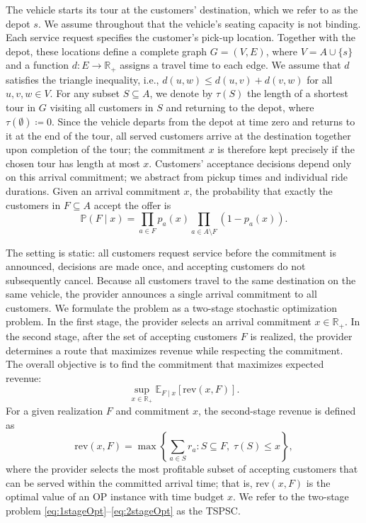 \documentclass[11pt]{article}
\theoremstyle{plain}
\theoremstyle{definition}
\begin{document}
	The vehicle starts its tour at the customers' destination, which we refer to as the depot $s$. We assume throughout that the vehicle's seating capacity is not binding. Each service request specifies the customer's pick-up location. Together with the depot, these locations define a complete graph $G = (V, E)$, where $V = A \cup \{s\}$ and a function $d \colon E \to \mathbb{R}_+$ assigns a travel time to each edge. We assume that $d$ satisfies the triangle inequality, i.e., $d(u,w) \leq d(u,v) + d(v,w)$ for all $u,v,w \in V$. For any subset $S \subseteq A$, we denote by $\tau(S)$ the length of a shortest tour in $G$ visiting all customers in $S$ and returning to the depot, where $\tau(\emptyset) \coloneqq 0$. Since the vehicle departs from the depot at time zero and returns to it at the end of the tour, all served customers arrive at the destination together upon completion of the tour; the commitment $x$ is therefore kept precisely if the chosen tour has length at most $x$. Customers' acceptance decisions depend only on this arrival commitment; we abstract from pickup times and individual ride durations. Given an arrival commitment $x$, the probability that exactly the customers in $F \subseteq A$ accept the offer is
	\[
	\mathbb{P}(F \mid x) = \prod_{a \in F} p_a(x) \prod_{a \in A \setminus F} (1 - p_a(x)).
	\]
	
	The setting is static: all customers request service before the commitment is announced, decisions are made once, and accepting customers do not subsequently cancel. Because all customers travel to the same destination on the same vehicle, the provider announces a single arrival commitment to all customers. We formulate the problem as a two-stage stochastic optimization problem. In the first stage, the provider selects an arrival commitment $x \in \mathbb{R}_+$. In the second stage, after the set of accepting customers $F$ is realized, the provider determines a route that maximizes revenue while respecting the commitment. The overall objective is to find the commitment that maximizes expected revenue:
	\begin{equation}\label{eq:1stageOpt}
		\sup_{x \in \mathbb{R}_+} \mathbb{E}_{F\mid x}\left[ \text{rev}(x, F)\right].
	\end{equation}
	For a given realization $F$ and commitment $x$, the second-stage revenue is defined as
	\begin{equation}\label{eq:2stageOpt}
		\text{rev}(x, F) = \max \left\{ \sum_{a \in S} r_a \colon S \subseteq F,\; \tau(S) \leq x \right\},
	\end{equation}
	where the provider selects the most profitable subset of accepting customers that can be served within the committed arrival time; that is, $\text{rev}(x, F)$ is the optimal value of an \ac{OP} instance with time budget $x$. We refer to the two-stage problem \eqref{eq:1stageOpt}--\eqref{eq:2stageOpt} as the \ac{TSPSC}.
	
\end{document}
